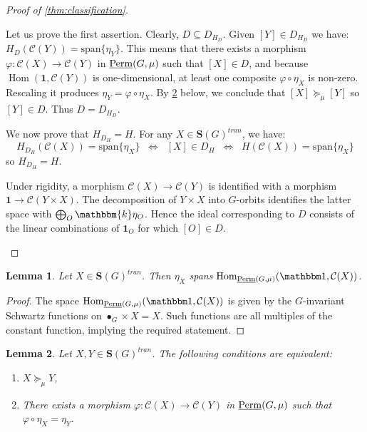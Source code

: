 \documentclass[11pt,a4paper]{amsart}
\theoremstyle{plain}%
\newtheorem{lemma}{Lemma}[subsection]
\theoremstyle{definition}
\theoremstyle{remark}
\newcommand{\Hom}{\operatorname{Hom}}
\newcommand{\triv}{{\mathbbm 1}}
\newcommand{\Span}{\mathrm{span}}
\newcommand{\Perm}{\underline{{\rm Perm}}}
\newcommand{\kk}{\mathbbm{k}}
\newcommand{\one}{{\mathbf{1}}}
\begin{document}
\begin{proof}[Proof of \cref{thm:classification}]
\begin{enumerate}[itemindent=0pt,leftmargin=*]
        Let us prove the first assertion. Clearly, $D\subseteq D_{H_D}$. Given $[Y]\in D_{H_D}$ we have: $H_D(\mathcal{C}(Y))= \Span\{\eta_Y\}$. This means that there exists a morphism $\varphi:\mathcal{C}(X)\to \mathcal{C}(Y)$ in $\Perm(G, \mu)$ such that $[X]\in D$, and because $\Hom(\one,\mathcal{C}(Y))$ is one-dimensional, at least one composite $\varphi \circ \eta_X$ is non-zero. Rescaling it produces $\eta_Y=\varphi\circ \eta_X $. By \cref{lem:subfunc_Hom_from_1_functoriality} below, we conclude that $[X]\succeq_\mu [Y]$ so $[Y]\in D$. Thus $D= D_{H_D}$.

        We now prove that $H_{D_H}{=} H$. For any $X\in \mathbf{S}(G)^{tran}$, we have:
        $$H_{D_H}(\mathcal{C}(X))= \Span\{\eta_X\} \;\;\Longleftrightarrow \;\; [X]\in D_H \;\;\Longleftrightarrow \;\; H(\mathcal{C}(X))= \Span\{\eta_X\} $$
        so $ H_{D_H} {=} H$.

        Under rigidity, a morphism $\mathcal{C}(X)\to \mathcal{C}(Y)$ is identified with a morphism $\one\to \mathcal{C}(Y\times X)$. The decomposition of $Y\times X$ into $G$-orbits identifies the latter space with $\bigoplus_O \kk\eta_O$. Hence the ideal corresponding to $D$ consists of the linear combinations of $\one_O$ for which $[O]\in D$.

    \end{enumerate}
\end{proof}
\begin{lemma}\label{lem:subfunc_Hom_from_1_gen_by_eta}
    Let $X\in \mathbf{S}(G)^{tran}$. Then $\eta_X$ spans $\Hom_{\Perm(G, \mu)}(\triv, \mathcal{C}(X))$.
\end{lemma}
\begin{proof}
   The space $\Hom_{\Perm(G, \mu)}(\triv, \mathcal{C}(X))$ is given by the $G$-invariant Schwartz functions on $\bullet_G\times X = X$. Such functions are all multiples of the constant function, implying the required statement.
\end{proof}
\begin{lemma}\label{lem:subfunc_Hom_from_1_functoriality}
Let $X, Y\in \mathbf{S}(G)^{tran}$.
The following conditions are equivalent:
\begin{enumerate}
    \item $X \succeq_{\mu} Y$,
    \item There exists a morphism $\varphi:\mathcal{C}(X)\to \mathcal{C}(Y)$ in $\Perm(G, \mu)$ such that $\varphi\circ \eta_X=\eta_Y$.
\end{enumerate}

\end{lemma}
\end{document}
